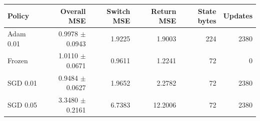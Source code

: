\begin{tabular}{lrrrrr}
\toprule
Policy & Overall MSE & Switch MSE & Return MSE & State bytes & Updates \\
\midrule
Adam 0.01 & 0.9978 $\pm$ 0.0943 & 1.9225 & 1.9003 & 224 & 2380 \\
Frozen & 1.0110 $\pm$ 0.0671 & 0.9611 & 1.2241 & 72 & 0 \\
SGD 0.01 & 0.9484 $\pm$ 0.0627 & 1.9652 & 2.2782 & 72 & 2380 \\
SGD 0.05 & 3.3480 $\pm$ 0.2161 & 6.7383 & 12.2006 & 72 & 2380 \\
\bottomrule
\end{tabular}
